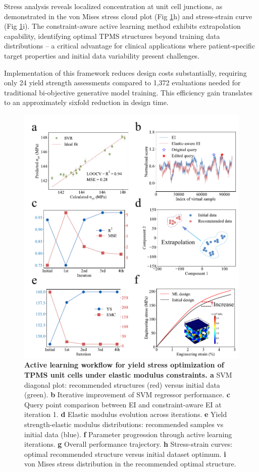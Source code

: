 \documentclass[preprint,review,12pt,authoryear]{elsarticle}
\begin{document}
Stress analysis reveals localized concentration at unit cell junctions, as demonstrated in the von Mises stress cloud plot (Fig \ref{fig:7}h) and stress-strain curve (Fig \ref{fig:7}i). The constraint-aware active learning method exhibits extrapolation capability, identifying optimal TPMS structures beyond training data distributions – a critical advantage for clinical applications where patient-specific target properties and initial data variability present challenges.

Implementation of this framework reduces design costs substantially, requiring only 24 yield strength assessments compared to 1,372 evaluations needed for traditional bi-objective generative model training. This efficiency gain translates to an approximately sixfold reduction in design time.

\begin{figure}
    \centering
    \includegraphics[width=1\linewidth]{figures/7.pdf}
    \caption{\textbf{Active learning workflow for yield stress optimization of TPMS unit cells under elastic modulus constraints. a} SVM diagonal plot: recommended structures (red) versus initial data (green). \textbf{b} Iterative improvement of SVM regressor performance. \textbf{c} Query point comparison between EI and constraint-aware EI at iteration 1. \textbf{d} Elastic modulus evolution across iterations. \textbf{e} Yield strength-elastic modulus distributions: recommended samples vs initial data (blue). \textbf{f} Parameter progression through active learning iterations. \textbf{g} Overall performance trajectory. \textbf{h} Stress-strain curves: optimal recommended structure versus initial dataset optimum. \textbf{i} von Mises stress distribution in the recommended optimal structure.}
    \label{fig:7}
\end{figure}
\end{document}
